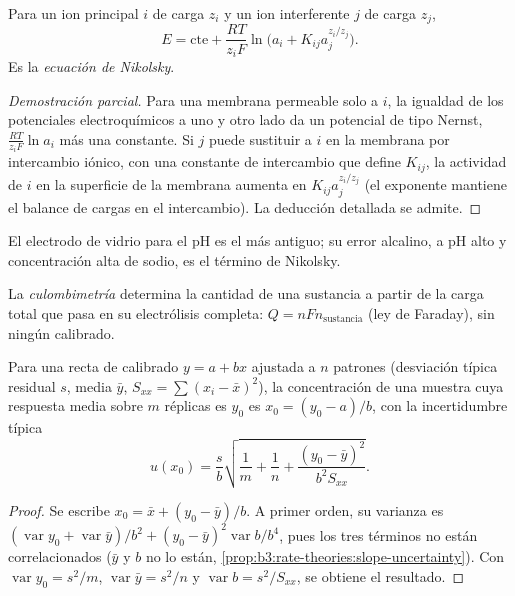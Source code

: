 \begin{proposition}\label{prop:b3:electrode-kinetics:nikolsky}
Para un ion principal $i$ de carga $z_i$ y un ion interferente $j$ de carga $z_j$,
\[
  E = \text{cte} + \frac{RT}{z_iF}\ln\bigl(a_i + K_{ij}a_j^{z_i/z_j}\bigr) .
\]
Es la \emph{ecuación de Nikolsky}.
\end{proposition}

\begin{proof}[Demostración parcial]
Para una membrana permeable solo a $i$, la igualdad de los potenciales electroquímicos
a uno y otro lado da un potencial de tipo Nernst, $\frac{RT}{z_iF}\ln a_i$ más una constante.
Si $j$ puede sustituir a $i$ en la membrana por intercambio iónico, con una constante de
intercambio que define $K_{ij}$, la actividad de $i$ en la superficie de la membrana aumenta en
$K_{ij}a_j^{z_i/z_j}$ (el exponente mantiene el balance de cargas en el intercambio). La deducción
detallada se admite.
\end{proof}

El electrodo de vidrio para el pH es el  más antiguo; su error
alcalino, a pH alto y concentración alta de sodio, es el término de Nikolsky.

\begin{definition}[Culombimetría]\label{def:b3:electrode-kinetics:coulometry}
La \emph{culombimetría} determina la cantidad de una sustancia a partir de la
carga total que pasa en su electrólisis completa: $Q = nFn_{\text{sustancia}}$ (ley de
Faraday), sin ningún calibrado.
\end{definition}

\begin{proposition}\label{prop:b3:electrode-kinetics:inverse-prediction}
Para una recta de calibrado $y = a + bx$ ajustada a $n$ patrones (desviación típica
residual $s$, media $\bar y$, $S_{xx} = \sum(x_i - \bar x)^2$), la concentración de una muestra cuya
respuesta media sobre $m$ réplicas es $y_0$ es $x_0 = (y_0 - a)/b$, con la
incertidumbre típica
\[
  u(x_0) = \frac{s}{b}\sqrt{\frac1m + \frac1n + \frac{(y_0 - \bar y)^2}{b^2S_{xx}}} .
\]
\end{proposition}

\begin{proof}
Se escribe $x_0 = \bar x + (y_0 - \bar y)/b$. A primer orden, su varianza es $(\operatorname{var}y_0 +
\operatorname{var}\bar y)/b^2 + (y_0 - \bar y)^2\operatorname{var}b/b^4$, pues los tres términos no están correlacionados ($\bar y$ y $b$
no lo están, \cref{prop:b3:rate-theories:slope-uncertainty}). Con $\operatorname{var}y_0 =
s^2/m$, $\operatorname{var}\bar y = s^2/n$ y $\operatorname{var}b = s^2/S_{xx}$, se obtiene el resultado.
\end{proof}


